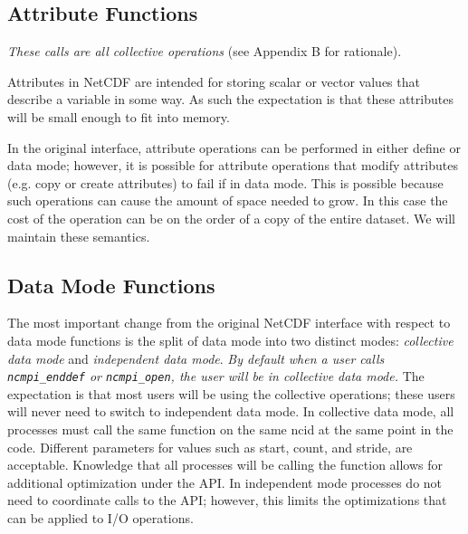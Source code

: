 \documentclass[10pt]{article}
\begin{document}
%

\subsection{Attribute Functions}

\emph{These calls are all collective operations} (see Appendix B for
rationale).

Attributes in NetCDF are intended for storing scalar or vector values that
describe a variable in some way.  As such the expectation is that these
attributes will be small enough to fit into memory.  

In the original interface, attribute operations can be performed in either
define or data mode; however, it is possible for attribute operations that
modify attributes (e.g. copy or create attributes) to fail if in data mode.
This is possible because such operations can cause the amount of space needed
to grow.  In this case the cost of the operation can be on the order of a copy
of the entire dataset.  We will maintain these semantics.

\subsection{Data Mode Functions}

The most important change from the original NetCDF interface with respect to
data mode functions is the split of data mode into two distinct modes:
\emph{collective data mode} and \emph{independent data mode}.  \emph{By default when
a user calls \texttt{ncmpi\_enddef} or \texttt{ncmpi\_open}, the user will be
in collective data mode.}  The expectation is that most users will be using the
collective operations; these users will never need to switch to independent
data mode.  In collective data mode, all processes must call the same function
on the same ncid at the same point in the code.  Different parameters for
values such as start, count, and stride, are acceptable.  Knowledge that all
processes will be calling the function allows for additional optimization
under the API.  In independent mode processes do not need to coordinate calls
to the API; however, this limits the optimizations that can be applied to I/O operations.
\end{document}
